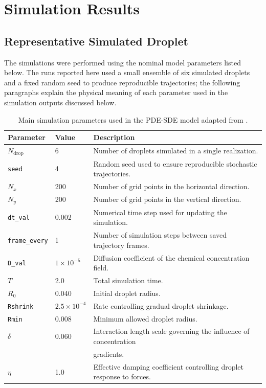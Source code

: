 \section{Simulation Results}

\subsection{Representative Simulated Droplet}

The simulations were performed using the nominal model parameters listed below. The runs reported here used a small ensemble of six simulated droplets and a fixed random seed to produce reproducible trajectories; the following paragraphs explain the physical meaning of each parameter used in the simulation outputs discussed below.

\begin{table}[htbp]
\centering
\caption{Main simulation parameters used in the PDE-SDE model adapted from \cite{droplet2025}.}
\label{tab:simulation_parameters}
\begin{tabular}{lll}
\hline
Parameter & Value & Description \\
\hline
$N_{\mathrm{drop}}$ & 6 & Number of droplets simulated in a single realization. \\

\texttt{seed} & 4 & Random seed used to ensure reproducible stochastic trajectories. \\

$N_x$ & 200 & Number of grid points in the horizontal direction. \\

$N_y$ & 200 & Number of grid points in the vertical direction. \\

\texttt{dt\_val} & 0.002 & Numerical time step used for updating the simulation. \\

\texttt{frame\_every} & 1 & Number of simulation steps between saved trajectory frames. \\

\texttt{D\_val} & $1\times10^{-5}$ & Diffusion coefficient of the chemical concentration field. \\

$T$ & 2.0 & Total simulation time. \\

$R_0$ & 0.040 & Initial droplet radius. \\

\texttt{Rshrink} & $2.5\times10^{-4}$ & Rate controlling gradual droplet shrinkage. \\

\texttt{Rmin} & 0.008 & Minimum allowed droplet radius. \\

$\delta$ & 0.060 & Interaction length scale governing the influence of concentration \\
& & gradients. \\

$\eta$ & 1.0 & Effective damping coefficient controlling droplet response to forces. \\
\hline
\end{tabular}
\end{table}
